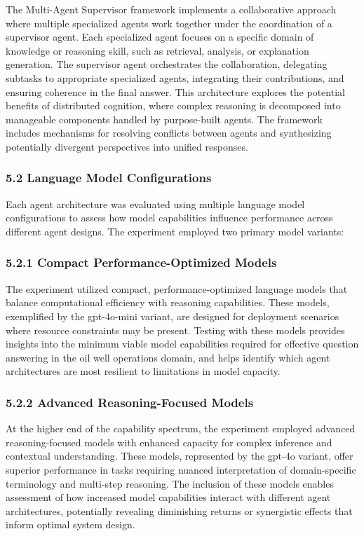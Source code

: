             The Multi-Agent Supervisor framework implements a collaborative approach where multiple specialized agents work together under the coordination of a supervisor agent. Each specialized agent focuses on a specific domain of knowledge or reasoning skill, such as retrieval, analysis, or explanation generation. The supervisor agent orchestrates the collaboration, delegating subtasks to appropriate specialized agents, integrating their contributions, and ensuring coherence in the final answer. This architecture explores the potential benefits of distributed cognition, where complex reasoning is decomposed into manageable components handled by purpose-built agents. The framework includes mechanisms for resolving conflicts between agents and synthesizing potentially divergent perspectives into unified responses.

            \subsubsection{5.2 Language Model Configurations}

            Each agent architecture was evaluated using multiple language model configurations to assess how model capabilities influence performance across different agent designs. The experiment employed two primary model variants:

            \subsubsection{5.2.1 Compact Performance-Optimized Models}

            The experiment utilized compact, performance-optimized language models that balance computational efficiency with reasoning capabilities. These models, exemplified by the gpt-4o-mini variant, are designed for deployment scenarios where resource constraints may be present. Testing with these models provides insights into the minimum viable model capabilities required for effective question answering in the oil well operations domain, and helps identify which agent architectures are most resilient to limitations in model capacity.

            \subsubsection{5.2.2 Advanced Reasoning-Focused Models}

            At the higher end of the capability spectrum, the experiment employed advanced reasoning-focused models with enhanced capacity for complex inference and contextual understanding. These models, represented by the gpt-4o variant, offer superior performance in tasks requiring nuanced interpretation of domain-specific terminology and multi-step reasoning. The inclusion of these models enables assessment of how increased model capabilities interact with different agent architectures, potentially revealing diminishing returns or synergistic effects that inform optimal system design.

